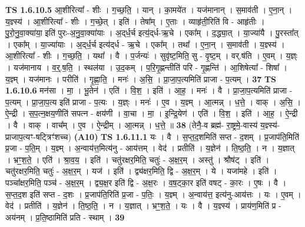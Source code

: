 \documentclass[17pt]{extarticle}
\begin{document}
                  \newline
                                \textbf{ TS 1.6.10.5} \newline
                  आ॒शीरित्या᳚ - शीः । ग॒च्छ॒ति॒ । यान् । का॒मये॑त । यज॑मानान् । स॒माव॑ती । ए॒ना॒न् । य॒ज्ञ्स्य॑ । आ॒शीरित्या᳚ - शीः । ग॒च्छे॒त् । इति॑ । तेषा᳚म् । ए॒ताः । व्याहृ॑ती॒रिति॑ वि - आहृ॑तीः । पु॒रो॒नु॒वा॒क्या॑या॒ इति॑ पुरः-अ॒नु॒वा॒क्या॑याः । अ॒द्‌र्ध॒र्च इत्य॒॑द्‌र्ध-ऋ॒चे । एका᳚म् । द॒द्ध्या॒त् । या॒ज्या॑यै । पु॒रस्ता᳚त् । एका᳚म् । या॒ज्या॑याः । अ॒द्‌र्ध॒र्च इत्य॑द्‌र्ध - ऋ॒चे । एका᳚म् । तथा᳚ । ए॒ना॒न् । स॒माव॑ती । य॒ज्ञ्स्य॑ । आ॒शीरित्या᳚ - शीः । ग॒च्छ॒ति॒ । यथा᳚ । वै । प॒र्जन्यः॑ । सुवृ॑ष्ट॒मिति॒ सु - वृ॒ष्ट॒म् । वर्.ष॑ति । ए॒वम् । य॒ज्ञ्ः । यज॑मानाय । व॒र्॒.ष॒ति॒ । स्थल॑या । उ॒द॒कम् । प॒रि॒गृ॒ह्णन्तीति॑ परि - गृ॒ह्णन्ति॑ । आ॒शिषेत्या᳚ - शिषा᳚ । य॒ज्ञ्म् । यज॑मानः । परीति॑ । गृ॒ह्णा॒ति॒ । मनः॑ । अ॒सि॒ । प्रा॒जा॒प॒त्यमिति॑ प्राजा - प॒त्यम् । \textbf{  37} \newline
                  \newline
                                \textbf{ TS 1.6.10.6} \newline
                  मन॑सा । मा॒ । भू॒तेन॑ । एति॑ । वि॒श॒ । इति॑ । आ॒ह॒ । मनः॑ । वै । प्रा॒जा॒प॒त्यमिति॑ प्राजा - प॒त्यम् । प्रा॒जा॒प॒त्य इति॑ प्राजा - प॒त्यः । य॒ज्ञ्ः । मनः॑ । ए॒व । य॒ज्ञ्म् । आ॒त्मन्न् । ध॒त्ते॒ । वाक् । अ॒सि॒ । ऐ॒न्द्री । स॒प॒त्न॒क्षय॒णीति॑ सपत्न - क्षय॑णी । वा॒चा । मा॒ । इ॒न्द्रि॒येण॑ । एति॑ । वि॒श॒ । इति॑ । आ॒ह॒ । ऐ॒न्द्री । वै । वाक् । वाच᳚म् । ए॒व । ऐ॒न्द्रीम् । आ॒त्मन्न् । ध॒त्ते॒ ॥ \textbf{  38} \newline
                  \newline
                      (तेनै॒-व ब्रह्म॑- रा॒ष्ट्रमे॒-वास्य॑ य॒ज्ञ्स्य॑-प्राजाप॒त्यꣳ-षट्त्रिꣳ॑शच्च)  \textbf{(A10)} \newline \newline
                                \textbf{ TS 1.6.11.1} \newline
                  यः । वै । स॒प्त॒द॒शमिति॑ सप्त - द॒शम् । प्र॒जाप॑ति॒मिति॑ प्र॒जा - प॒ति॒म् । य॒ज्ञ्म् । अ॒न्वाय॑त्त॒मित्य॑नु - आय॑त्तम् । वेद॑ । प्रतीति॑ । य॒ज्ञेन॑ । ति॒ष्ठ॒ति॒ । न । य॒ज्ञात् । भ्रꣳ॒॒श॒ते॒ । एति॑ । श्रा॒व॒य॒ । इति॑ । चतु॑रक्षर॒मिति॒ चतुः॑ - अ॒क्ष॒र॒म् । अस्तु॑ । श्रौष॑ट् । इति॑ । चतु॑रक्षर॒मिति॒ चतुः॑ - अ॒क्ष॒र॒म् । यज॑ । इति॑ । द्व्य॑क्षर॒मिति॒ द्वि - अ॒क्ष॒र॒म् । ये । यजा॑महे । इति॑ । पञ्चा᳚क्षर॒मिति॒ पञ्च॑ - अ॒क्ष॒र॒म् । द्व्य॒क्ष॒र इति॑ द्वि - अ॒क्ष॒रः । व॒ष॒ट्का॒र इति॑ वषट् - का॒रः । ए॒षः । वै । स॒प्त॒द॒श इति॑ सप्त - द॒शः । प्र॒जाप॑ति॒रिति॑ प्र॒जा - प॒तिः॒ । य॒ज्ञ्म् । अ॒न्वाय॑त्त॒ इत्य॑नु-आय॑त्तः । यः । ए॒वम् । वेद॑ । प्रतीति॑ । य॒ज्ञेन॑ । ति॒ष्ठ॒ति॒ । न । य॒ज्ञात् । भ्रꣳ॒॒श॒ते॒ । यः । वै । य॒ज्ञ्स्य॑ । प्राय॑ण॒मिति॑ प्र - अय॑नम् । प्र॒ति॒ष्ठामिति॑ प्रति - स्थाम् । \textbf{  39} \newline
\end{document}
